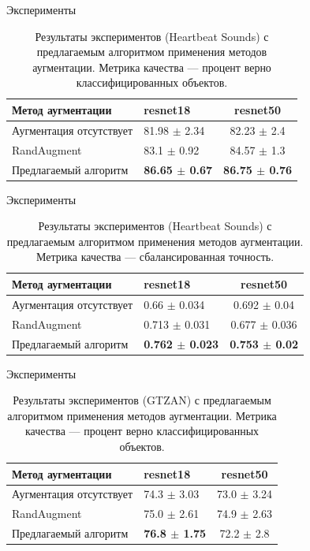 \documentclass[12pt, fleqn]{beamer}
\begin{document}
\begin{frame}{Эксперименты}
	\begin{table}[ht!]
    \centering
	\begin{tabular}{| l | l | c |}
    	\hline
	    Метод аугментации & resnet18 & resnet50 \\ \hline
	    Аугментация отсутствует  & 81.98 $\pm$ 2.34 & 82.23 $\pm$ 2.4 \\ \hline
	    RandAugment & 83.1 $\pm$ 0.92 & 84.57 $\pm$ 1.3 \\ \hline
	    Предлагаемый алгоритм & \textbf{86.65 $\pm$ 0.67} & \textbf{86.75 $\pm$ 0.76} \\ \hline
	\end{tabular}
	\caption{Результаты экспериментов (Heartbeat Sounds) с предлагаемым алгоритмом применения методов аугментации. Метрика качества --- процент верно классифицированных объектов.}
	\label{table:lukianov_pavel_t3}
\end{table}
\end{frame}

\begin{frame}{Эксперименты}
	\begin{table}[ht!]
    \centering
	\begin{tabular}{| l | l | c |}
    	\hline
	    Метод аугментации & resnet18 & resnet50 \\ \hline
	    Аугментация отсутствует  & 0.66 $\pm$ 0.034 & 0.692 $\pm$ 0.04 \\ \hline
	    RandAugment & 0.713 $\pm$ 0.031 & 0.677 $\pm$ 0.036 \\ \hline
	    Предлагаемый алгоритм & \textbf{0.762 $\pm$ 0.023} & \textbf{0.753 $\pm$ 0.02} \\ \hline
	\end{tabular}
	\caption{Результаты экспериментов (Heartbeat Sounds) с предлагаемым алгоритмом применения методов аугментации. Метрика качества --- сбалансированная точность.}
	\label{table:lukianov_pavel_t3}
\end{table}
\end{frame}

\begin{frame}{Эксперименты}
	\begin{table}[ht!]
    \centering
	\begin{tabular}{| l | l | c |}
    	\hline
	    Метод аугментации & resnet18 & resnet50 \\ \hline
	    Аугментация отсутствует  & 74.3 $\pm$ 3.03 & 73.0 $\pm$ 3.24 \\ \hline
	    RandAugment & 75.0 $\pm$ 2.61 & 74.9 $\pm$ 2.63 \\ \hline
	    Предлагаемый алгоритм & \textbf{76.8 $\pm$ 1.75} & 72.2 $\pm$ 2.8 \\ \hline
	\end{tabular}
	\caption{Результаты экспериментов (GTZAN) с предлагаемым алгоритмом применения методов аугментации. Метрика качества --- процент верно классифицированных объектов.}
	\label{table:lukianov_pavel_t4}
\end{table}
\end{frame}
\end{document}
